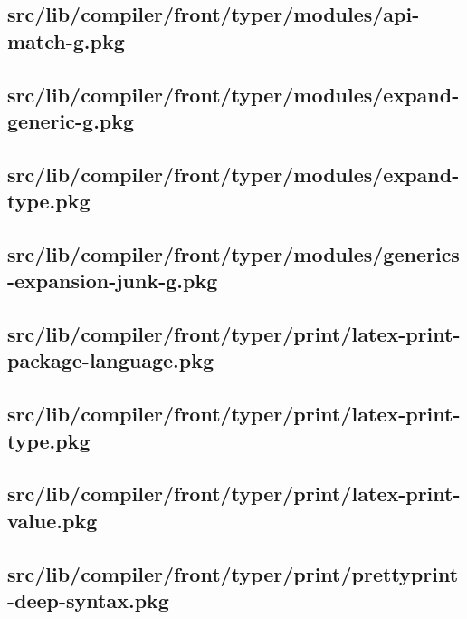 \subsection{src/lib/compiler/front/typer/modules/api-match-g.pkg}


\subsection{src/lib/compiler/front/typer/modules/expand-generic-g.pkg}


\subsection{src/lib/compiler/front/typer/modules/expand-type.pkg}


\subsection{src/lib/compiler/front/typer/modules/generics-expansion-junk-g.pkg}


\subsection{src/lib/compiler/front/typer/print/latex-print-package-language.pkg}


\subsection{src/lib/compiler/front/typer/print/latex-print-type.pkg}


\subsection{src/lib/compiler/front/typer/print/latex-print-value.pkg}


\subsection{src/lib/compiler/front/typer/print/prettyprint-deep-syntax.pkg}


